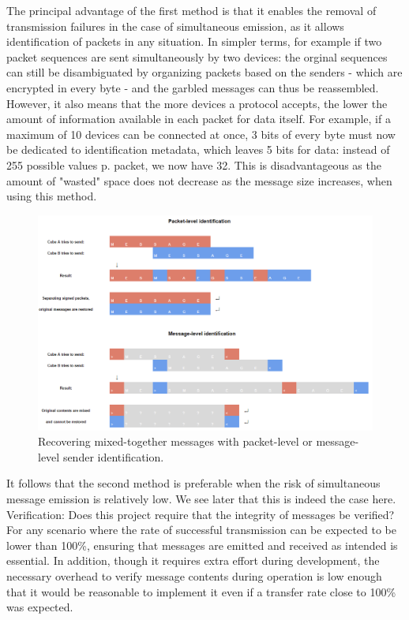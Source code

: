 The principal advantage of the first method is that it enables the removal of transmission failures in the case of simultaneous emission, as it allows identification of packets in any situation. In simpler terms, for example if two packet sequences are sent simultaneously by two devices: the orginal sequences can still be disambiguated by organizing packets based on the senders - which are encrypted in every byte - and the garbled messages can thus be reassembled.\\

However, it also means that the more devices a protocol accepts, the lower the amount of information available in each packet for data itself. For example, if a maximum of 10 devices can be connected at once, 3 bits of every byte must now be dedicated to identification metadata, which leaves 5 bits for data: instead of 255 possible values p. packet, we now have 32. This is disadvantageous as the amount of "wasted" space does not decrease as the message size increases, when using this method.\\

\begin{figure}[ht]
   \centering
   \includegraphics[width=1\textwidth]{img/disambiguation.png}
   \caption{Recovering mixed-together messages with packet-level or message-level sender identification.}
   \label{img:disambiguation}
\end{figure}

It follows that the second method is preferable when the risk of simultaneous message emission is relatively low. We see later that this is indeed the case here. \\


Verification: Does this project require that the integrity of messages be verified? For any scenario where the rate of successful transmission can be expected to be lower than 100\%, ensuring that messages are emitted and received as intended is essential. In addition, though it requires extra effort during development, the necessary overhead to verify message contents during operation is low enough that it would be reasonable to implement it even if a transfer rate close to 100\% was expected.


